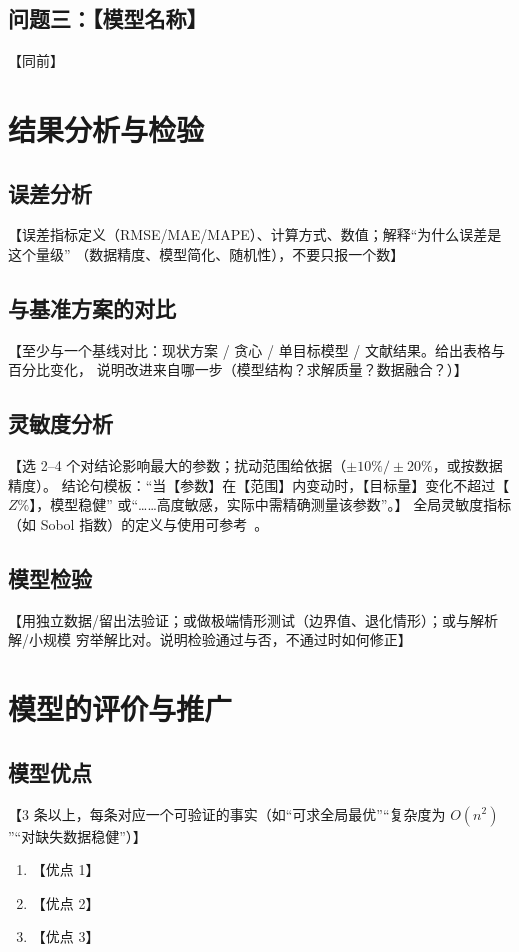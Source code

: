 \documentclass[12pt,a4paper,fontset=windows]{ctexart}
\begin{document}
\subsection{问题三：【模型名称】}
【同前】

\section{结果分析与检验}

\subsection{误差分析}
【误差指标定义（RMSE/MAE/MAPE）、计算方式、数值；解释“为什么误差是这个量级”
（数据精度、模型简化、随机性），不要只报一个数】

\subsection{与基准方案的对比}
【至少与一个基线对比：现状方案 / 贪心 / 单目标模型 / 文献结果。给出表格与百分比变化，
说明改进来自哪一步（模型结构？求解质量？数据融合？）】

\subsection{灵敏度分析}
【选 2--4 个对结论影响最大的参数；扰动范围给依据（$\pm 10\%/\pm 20\%$，或按数据精度）。
结论句模板：“当【参数】在【范围】内变动时，【目标量】变化不超过【$Z\%$】，模型稳健”
或“……高度敏感，实际中需精确测量该参数”。】
全局灵敏度指标（如 Sobol 指数）的定义与使用可参考~\cite{saltelli2008global}。

\subsection{模型检验}
【用独立数据/留出法验证；或做极端情形测试（边界值、退化情形）；或与解析解/小规模
穷举解比对。说明检验通过与否，不通过时如何修正】

\section{模型的评价与推广}
\subsection{模型优点}
【3 条以上，每条对应一个可验证的事实（如“可求全局最优”“复杂度为 $O(n^2)$”“对缺失数据稳健”）】
\begin{enumerate}
  \item 【优点 1】
  \item 【优点 2】
  \item 【优点 3】
\end{enumerate}
\end{document}

